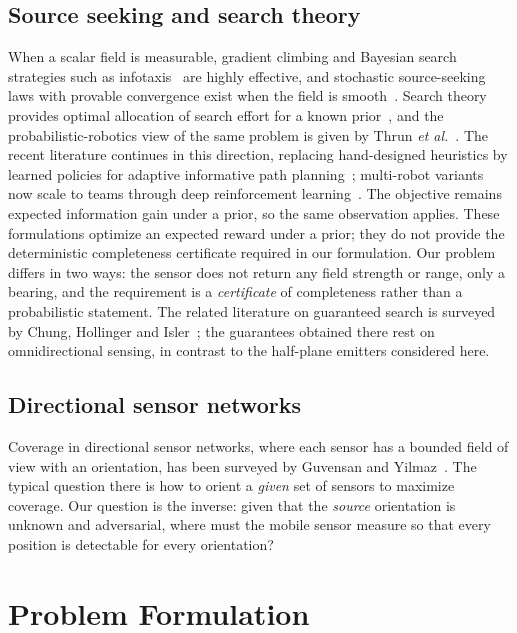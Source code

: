 \documentclass[preprint,12pt,3p]{elsarticle}
\theoremstyle{definition}
\begin{document}
\subsection{Source seeking and search theory}
When a scalar field is measurable, gradient climbing and Bayesian search strategies such as
infotaxis~\cite{vergassola2007} are highly effective, and stochastic source-seeking laws with
provable convergence exist when the field is smooth~\cite{azuma2012}. Search theory provides
optimal allocation of search effort for a known prior~\cite{stone2007,koopman1980}, and the
probabilistic-robotics view of the same problem is given by
Thrun \emph{et al.}~\cite{thrun2005}. The recent literature continues in this direction,
replacing hand-designed heuristics by learned policies for adaptive informative path
planning~\cite{popovic2024}; multi-robot variants now scale to teams through deep reinforcement
learning~\cite{vashisth2026}. The objective remains expected information gain under a prior, so
the same observation applies. These formulations optimize an expected reward under a
prior; they do not provide the deterministic completeness certificate required in our
formulation. Our problem differs in two ways:
the sensor does not return any field strength or range, only a bearing, and the requirement is a
\emph{certificate} of completeness rather than a probabilistic statement. The related literature on guaranteed search is surveyed by Chung, Hollinger and
Isler~\cite{chung2011}; the guarantees obtained there rest on omnidirectional sensing, in contrast
to the half-plane emitters considered here.

\subsection{Directional sensor networks}
Coverage in directional sensor networks, where each sensor has a bounded field of view with an
orientation, has been surveyed by Guvensan and Yilmaz~\cite{guvensan2011}. The typical question
there is how to orient a \emph{given} set of sensors to maximize coverage. Our question is the
inverse: given that the \emph{source} orientation is unknown and adversarial, where must the
mobile sensor measure so that every position is detectable for every orientation?

\section{Problem Formulation}
\label{sec:problem}
\end{document}
